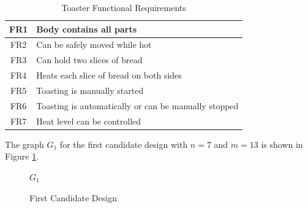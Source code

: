 \begin{table}[h]
  \label{toasterfrs}
  \begin{center}
    \begin{tabular}{|c|l|}
      \hline
      FR1 & Body contains all parts \\
      \hline
      FR2 & Can be safely moved while hot \\
      \hline
      FR3 & Can hold two slices of bread \\
      \hline
      FR4 & Heats each slice of bread on both sides \\
      \hline
      FR5 & Toasting is manually started \\
      \hline
      FR6 & Toasting is automatically or can be manually stopped \\
      \hline
      FR7 & Heat level can be controlled \\
      \hline
    \end{tabular}
  \end{center}
  \caption{Toaster Functional Requirements}
\end{table}

The graph \(G_1\) for the first candidate design with \(n=7\) and \(m=13\) is shown in Figure \ref{fig:design1}.

\begin{figure}[h]
  \label{fig:design1}
  \begin{center}

    \bigskip

    \(G_1\)
  \end{center}
  \caption{First Candidate Design}
\end{figure}

